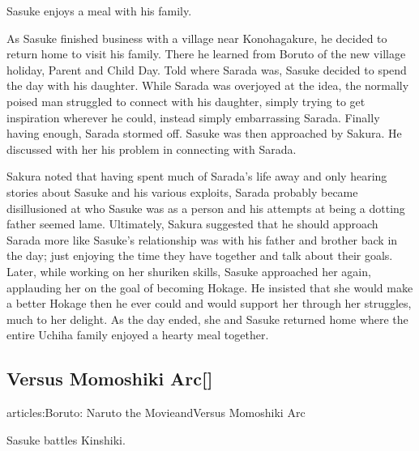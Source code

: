 \documentclass[a4paper,12pt]{article}
\begin{document}
Sasuke enjoys a meal with his family.\\ \par \vspace{0.5cm}

As Sasuke finished business with a village near Konohagakure, he decided to return home to visit his family. There he learned from Boruto of the new village holiday, Parent and Child Day. Told where Sarada was, Sasuke decided to spend the day with his daughter. While Sarada was overjoyed at the idea, the normally poised man struggled to connect with his daughter, simply trying to get inspiration wherever he could, instead simply embarrassing Sarada. Finally having enough, Sarada stormed off. Sasuke was then approached by Sakura. He discussed with her his problem in connecting with Sarada.\\ \par \vspace{0.5cm}

Sakura noted that having spent much of Sarada's life away and only hearing stories about Sasuke and his various exploits, Sarada probably became disillusioned at who Sasuke was as a person and his attempts at being a dotting father seemed lame. Ultimately, Sakura suggested that he should approach Sarada more like Sasuke's relationship was with his father and brother back in the day; just enjoying the time they have together and talk about their goals. Later, while working on her shuriken skills, Sasuke approached her again, applauding her on the goal of becoming Hokage. He insisted that she would make a better Hokage then he ever could and would support her through her struggles, much to her delight. As the day ended, she and Sasuke returned home where the entire Uchiha family enjoyed a hearty meal together.\\ \par \vspace{0.5cm}

\subsection*{Versus Momoshiki Arc[]}\n\nMain articles:Boruto: Naruto the MovieandVersus Momoshiki Arc\\ \par \vspace{0.5cm}

Sasuke battles Kinshiki.\\ \par \vspace{0.5cm}
\end{document}
